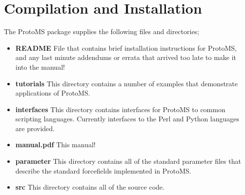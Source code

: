 \documentclass[letterpaper,10pt,english]{sphinxmanual}
\begin{document}
\chapter{Compilation and Installation}
\label{compilation:compilation-and-installation}\label{compilation::doc}
The ProtoMS package supplies the following files and directories;
\begin{itemize}
\item {} 
\textbf{README} File that contains brief installation instructions for ProtoMS, and any last minute addendums or errata that arrived too late to make it into the manual!

\item {} 
\textbf{tutorials} This directory contains a number of examples that demonstrate applications of ProtoMS.

\item {} 
\textbf{interfaces} This directory contains interfaces for ProtoMS to common scripting languages. Currently interfaces to the Perl and Python languages are provided.

\item {} 
\textbf{manual.pdf} This manual!

\item {} 
\textbf{parameter} This directory contains all of the standard parameter files that describe the standard forcefields implemented in ProtoMS.

\item {} 
\textbf{src} This directory contains all of the source code.

\end{itemize}
\end{document}
